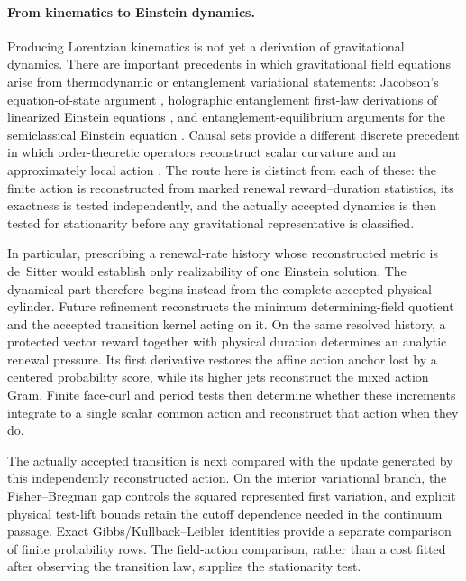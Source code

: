 \documentclass[11pt]{article}
\numberwithin{equation}{section}
\theoremstyle{definition}
\theoremstyle{remark}
\begin{document}
\paragraph{From kinematics to Einstein dynamics.}
Producing Lorentzian kinematics is not yet a derivation of gravitational
dynamics.  There are important precedents in which gravitational field
equations arise from thermodynamic or entanglement variational statements:
Jacobson's equation-of-state argument \cite{jacobson1995}, holographic
entanglement first-law derivations of linearized Einstein equations
\cite{LashkariMcDermottVanRaamsdonk2014}, and entanglement-equilibrium
arguments for the semiclassical Einstein equation \cite{Jacobson2016}.  Causal
sets provide a different discrete precedent in which order-theoretic
operators reconstruct scalar curvature and an approximately local action
\cite{BenincasaDowker2010}.  The route here is distinct from each of these: the
finite action is reconstructed from marked renewal reward--duration statistics,
its exactness is tested independently, and the actually accepted dynamics is
then tested for stationarity before any gravitational representative is
classified.

In particular, prescribing a renewal-rate history whose reconstructed metric
is de~Sitter would establish only realizability of one Einstein solution.  The
dynamical part therefore begins instead from the complete accepted physical
cylinder.  Future refinement reconstructs the
minimum determining-field quotient and the accepted transition kernel acting
on it.  On the same resolved history, a protected vector reward together with
physical duration determines an analytic renewal pressure.  Its first
derivative restores the affine action anchor lost by a centered probability
score, while its higher jets reconstruct the mixed action Gram.  Finite
face-curl and period tests then determine whether these increments integrate
to a single scalar common action and reconstruct that action when they do.

The actually accepted transition is next compared with the update generated
by this independently reconstructed action.  On the interior variational
branch, the Fisher--Bregman gap controls the squared represented first
variation, and explicit physical test-lift bounds retain the cutoff dependence
needed in the continuum passage.  Exact Gibbs/Kullback--Leibler identities
provide a separate comparison of finite probability rows.  The field-action
comparison, rather than a cost fitted after observing the transition law,
supplies the stationarity test.
\end{document}
